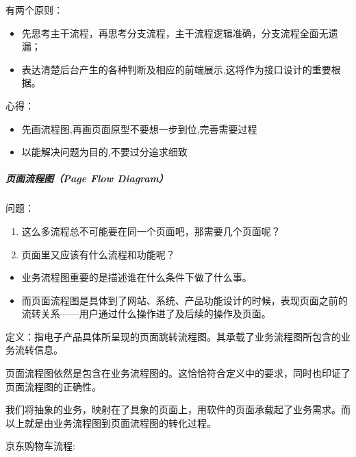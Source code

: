 \documentclass[letterpaper,10pt,english]{sphinxmanual}
\begin{document}
有两个原则：
\begin{itemize}
\item {} 
先思考主干流程，再思考分支流程，主干流程逻辑准确，分支流程全面无遗漏；

\item {} 
表达清楚后台产生的各种判断及相应的前端展示,这将作为接口设计的重要根据。

\end{itemize}

心得：
\begin{itemize}
\item {} 
先画流程图,再画页面原型不要想一步到位,完善需要过程

\item {} 
以能解决问题为目的,不要过分追求细致

\end{itemize}


\subparagraph{页面流程图（Page Flow Diagram）}
\label{\detokenize{chapter_knowledge/flow_chart:page-flow-diagram}}\label{\detokenize{chapter_knowledge/flow_chart:axure-1}}
问题：
\begin{enumerate}
%
\item {} 
这么多流程总不可能要在同一个页面吧，那需要几个页面呢？

\item {} 
页面里又应该有什么流程和功能呢？

\end{enumerate}
\begin{itemize}
\item {} 
业务流程图重要的是描述谁在什么条件下做了什么事。

\item {} 
而页面流程图是具体到了网站、系统、产品功能设计的时候，表现页面之前的流转关系——用户通过什么操作进了及后续的操作及页面。

\end{itemize}

定义：指电子产品具体所呈现的页面跳转流程图。其承载了业务流程图所包含的业务流转信息。

页面流程图依然是包含在业务流程图的。这恰恰符合定义中的要求，同时也印证了页面流程图的正确性。

我们将抽象的业务，映射在了具象的页面上，用软件的页面承载起了业务需求。而以上就是由业务流程图到页面流程图的转化过程。

京东购物车流程:
\end{document}
